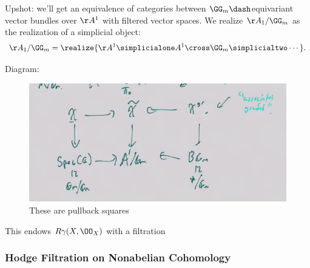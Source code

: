 \begin{remark}

Upshot: we'll get an equivalence of categories between
\(\GG_m\dash\)equivariant vector bundles over \(\AA^1\) with filtered
vector spaces. We realize \(\AA_1/\GG_m\) as the realization of a
simplicial object:
\begin{align*}
\AA_1/\GG_m = \realize{ \AA^1 \simplicialone A^1 \cross \GG_m \simplicialtwo \cdots }
.\end{align*}

\end{remark}

\begin{remark}

Diagram:

\begin{figure}
\centering
\includegraphics{figures/image_2021-06-05-16-13-37.png}
\caption{These are pullback squares}
\end{figure}

This endows \(R \gamma(X, \OO_X)\) with a filtration

\end{remark}

\hypertarget{hodge-filtration-on-nonabelian-cohomology}{%
\subsubsection{Hodge Filtration on Nonabelian
Cohomology}\label{hodge-filtration-on-nonabelian-cohomology}}

